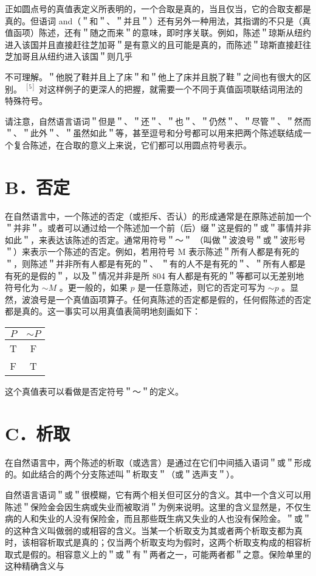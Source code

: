 正如圆点号的真值表定义所表明的，一个合取是真的，当且仅当，它的合取支都是真的。但语词 and（＂和＂、＂并且＂）还有另外一种用法，其指谓的不只是（真值函项）陈述，还有＂随之而来＂的意味，即时序关联。例如，陈述＂琼斯从纽约进入该国并且直接赶往芝加哥＂是有意义的且可能是真的，而陈述＂琼斯直接赶往芝加哥且从纽约进入该国＂则几乎

不可理解。＂他脱了鞋并且上了床＂和＂他上了床并且脱了鞋＂之间也有很大的区别。 ${ }^{[5]}$ 对这样例子的更深人的把握，就需要一个不同于真值函项联结词用法的特殊符号。

请注意，自然语言语词＂但是＂、＂还＂、＂也＂、＂仍然＂、＂尽管＂、＂然而＂、＂此外＂、＂虽然如此＂等，甚至逗号和分号都可以用来把两个陈述联结成一个复合陈述，在合取的意义上来说，它们都可以用圆点符号表示。

\section*{B．否定}
在自然语言中，一个陈述的否定（或拒斥、否认）的形成通常是在原陈述前加一个＂并非＂。或者可以通过给一个陈述加一个前（后）缀＂这是假的＂或＂事情并非如此＂，来表达该陈述的否定。通常用符号＂～＂ （叫做＂波浪号＂或＂波形号＂）来表示一个陈述的否定。例如，若用符号 M 表示陈述＂所有人都是有死的＂，则陈述＂并非所有人都是有死的＂、 ＂有的人不是有死的＂、＂所有人都是有死的是假的＂，以及＂情况并非是所 804 有人都是有死的＂等都可以无差别地符号化为 $\sim M$ 。更一般的，如果 $p$ 是一任意陈述，则它的否定可写为 $\sim p$ 。显然，波浪号是一个真值函项算子。任何真陈述的否定都是假的，任何假陈述的否定都是真的。这一事实可以用真值表简明地刻画如下：

\begin{center}
\begin{tabular}{|cc|}
\hline
$P$ & $\sim P$ \\
\hline
T & F \\
F & T \\
\hline
\end{tabular}
\end{center}

这个真值表可以看做是否定符号＂～＂的定义。

\section*{C．析取}
在自然语言中，两个陈述的析取（或选言）是通过在它们中间插入语词＂或＂形成的。如此结合的两个分支陈述叫＂析取支＂（或＂选声支＂）。

自然语言语词＂或＂很模糊，它有两个相关但可区分的含义。其中一个含义可以用陈述＂保险金会因生病或失业而被取消＂为例来说明。这里的含义显然是，不仅生病的人和失业的人没有保险金，而且那些既生病又失业的人也没有保险金。＂或＂的这种含义叫做弱的或相容的含义。当某一个析取支为其或者两个析取支都为真时，该相容析取式是真的；仅当两个析取支均为假时，这两个析取支构成的相容析取式是假的。相容意义上的＂或＂有＂两者之一，可能两者都＂之意。保险单里的这种精确含义与

